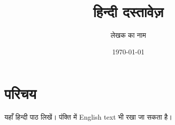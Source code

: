 \documentclass[11pt,a4paper]{article}
\title{हिन्दी दस्तावेज़}
\author{लेखक का नाम}
\date{\today}
\begin{document}
\maketitle
\section{परिचय}
यहाँ हिन्दी पाठ लिखें। पंक्ति में English text भी रखा जा सकता है।
\end{document}
